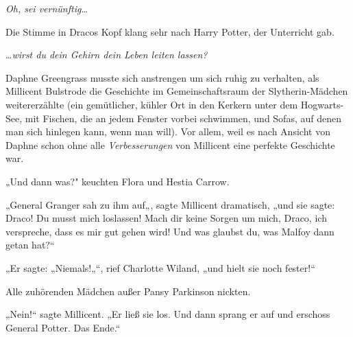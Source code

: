 \emph{Oh, sei vernünftig}…

Die Stimme in Dracos Kopf klang sehr nach Harry Potter, der Unterricht gab.

…\emph{wirst du dein Gehirn dein Leben leiten lassen?}


Daphne Greengrass musste sich anstrengen um sich ruhig zu verhalten, als Millicent Bulstrode die Geschichte im Gemeinschaftsraum der Slytherin-Mädchen weitererzählte (ein gemütlicher, kühler Ort in den Kerkern unter dem Hogwarts-See, mit Fischen, die an jedem Fenster vorbei schwimmen, und Sofas, auf denen man sich hinlegen kann, wenn man will). Vor allem, weil es nach Ansicht von Daphne schon ohne alle \emph{Verbesserungen} von Millicent eine perfekte Geschichte war.

„Und dann was?" keuchten Flora und Hestia Carrow.

„General Granger sah zu ihm auf„, sagte Millicent dramatisch, „und sie sagte: Draco! Du musst mich loslassen! Mach dir keine Sorgen um mich, Draco, ich verspreche, dass es mir gut gehen wird! Und was glaubst du, was Malfoy dann getan hat?“

„Er sagte: „Niemals!„“, rief Charlotte Wiland, „und hielt sie noch fester!“

Alle zuhörenden Mädchen außer Pansy Parkinson nickten.

„Nein!“ sagte Millicent. „Er ließ sie los. Und dann sprang er auf und erschoss General Potter. Das Ende.“

